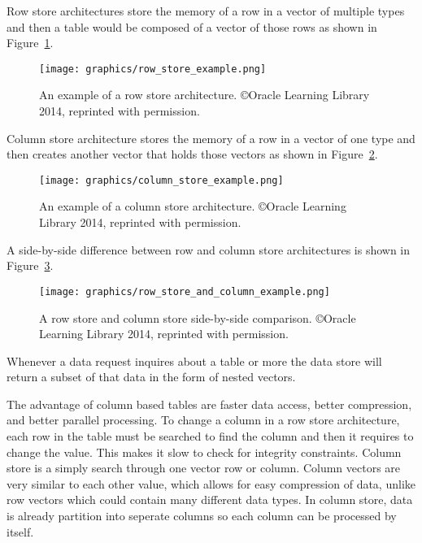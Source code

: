 \documentclass[letterpaper, 11pt]{article}
\begin{document}
Row store architectures store the memory of a row in a vector of multiple types and then
a table would be composed of a vector of those rows as shown in Figure~\ref{fig:row_store_ex}.
\begin{figure}[H]
  \centering
  \texttt{[image: graphics/row\_store\_example.png]}
  \caption{An example of a row store architecture. \copyright Oracle Learning Library 2014, reprinted with permission.\cite{rowstore}}
  \label{fig:row_store_ex}
\end{figure}

Column store architecture stores the memory of a row in a vector of one type and then 
creates another vector that holds those vectors as shown in Figure~\ref{fig:column_store_ex}.
\par\vspace{\baselineskip}

\begin{figure}
  \centering
  \texttt{[image: graphics/column\_store\_example.png]}
  \caption{An example of a column store architecture. \copyright Oracle Learning Library 2014, reprinted with permission.\cite{rowstore}}
  \label{fig:column_store_ex}
\end{figure}

A side-by-side difference between row and column store architectures is shown in Figure~\ref{fig:row_column_diff}.
\par\vspace{\baselineskip}

\begin{figure}
  \centering
  \texttt{[image: graphics/row\_store\_and\_column\_example.png]}
  \caption{A row store and column store side-by-side comparison. \newline \copyright Oracle Learning Library 2014, reprinted with permission.\cite{rowstore}}
  \label{fig:row_column_diff}
\end{figure}

Whenever a data request inquires about a table or more the data store will return a subset of that
data in the form of nested vectors.
\par\vspace{\baselineskip}

The advantage of column based tables are faster data access, better compression, and better parallel processing.
To change a column in a row store architecture, each row in the table must be searched to find the
column and then it requires to change the value. This makes it slow to check for integrity constraints. Column store
is a simply search through one vector row or column. Column vectors are very similar to each other value, which allows
for easy compression of data, unlike row vectors which could contain many different data types. In column store, data
is already partition into seperate columns so each column can be processed by itself.
\par\vspace{\baselineskip}
\end{document}
